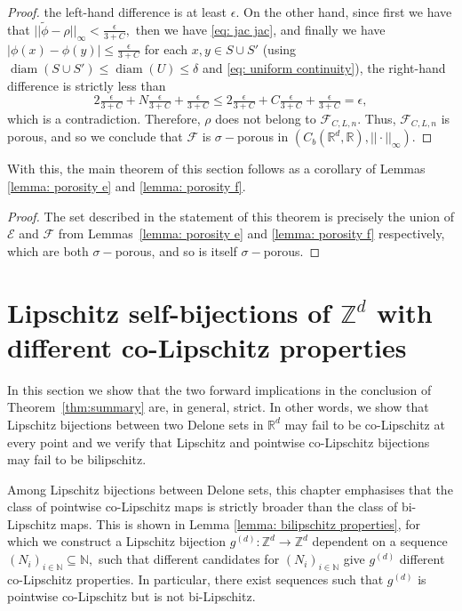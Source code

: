 \documentclass{article}
\newcommand{\R}{\mathbb{R}}
\newcommand{\Z}{\mathbb{Z}}
\newcommand{\N}{\mathbb{N}}
\DeclareMathOperator{\diam}{diam}
\begin{document}
\begin{proof}
the left-hand difference is at least $\epsilon.$ On the other hand, since first we have that $||\widetilde{\phi}-\rho||_{\infty} < \frac{\epsilon}{3+C},$ then we have \eqref{eq: jac jac}, and finally we have $|\phi(x)-\phi(y)| \leq \frac{\epsilon}{3+C}$ for each $x,y \in S \cup S'$ (using $\diam(S \cup S') \leq \diam(U) \leq \delta$ and \eqref{eq: uniform continuity}), the right-hand difference is strictly less than $$2\tfrac{\epsilon}{3+C} + N\tfrac{\epsilon}{3+C} + \tfrac{\epsilon}{3+C} \leq 2\tfrac{\epsilon}{3+C} + C\tfrac{\epsilon}{3+C} + \tfrac{\epsilon}{3+C} = \epsilon,$$ which is a contradiction. Therefore, $\rho$ does not belong to $\mathcal{F}_{C,L,n}.$ Thus, $\mathcal{F}_{C,L,n}$ is porous, and so we conclude that $\mathcal{F}$ is $\sigma-$porous in $(C_b(\R^d,\R), ||\cdot||_{\infty}).$
\end{proof}
With this, the main theorem of this section follows as a corollary of Lemmas \ref{lemma: porosity e} and \ref{lemma: porosity f}.
\pushforwardthm*
\begin{proof}
 The set described in the statement of this theorem is precisely the union of $\mathcal{E}$ and $\mathcal{F}$ from Lemmas~\ref{lemma: porosity e} and \ref{lemma: porosity f} respectively, which are both $\sigma-$porous, and so is itself $\sigma-$porous.
\end{proof} 
\section{Lipschitz self-bijections of $\Z^d$ with different co-Lipschitz properties} \label{chapter 4}
   In this section we show that the two forward implications in the conclusion of Theorem~\ref{thm:summary} are, in general, strict. In other words, we show that Lipschitz bijections between two Delone sets in $\R^{d}$ may fail to be co-Lipschitz at every point and we verify that Lipschitz and pointwise co-Lipschitz bijections may fail to be bilipschitz. 
   
   Among Lipschitz bijections between Delone sets, this chapter emphasises that the class of pointwise co-Lipschitz maps is strictly broader than the class of bi-Lipschitz maps. This is shown in Lemma \ref{lemma: bilipschitz properties}, for which we construct a Lipschitz bijection $g^{(d)}:\Z^d \to \Z^d$ dependent on a sequence $(N_i)_{i \in \N} \subseteq \N,$ such that different candidates for $(N_i)_{i \in \N}$ give $g^{(d)}$ different co-Lipschitz properties. In particular, there exist sequences such that $g^{(d)}$ is pointwise co-Lipschitz but is not bi-Lipschitz.
 
\end{document}
